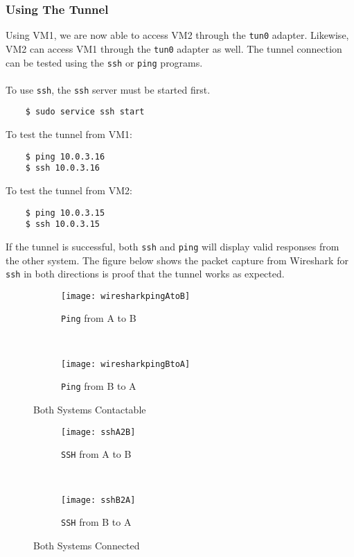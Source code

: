 \documentclass[a4paper,12pt]{article}
\begin{document}
	\subsubsection{Using The Tunnel}
	Using VM1, we are now able to access VM2 through the \texttt{tun0} adapter. Likewise, VM2 can access VM1 through the \texttt{tun0} adapter as well. The tunnel connection can be tested using the \texttt{ssh} or \texttt{ping} programs.\\\\
	To use \texttt{ssh}, the \texttt{ssh} server must be started first.
	\begin{verbatim}
	$ sudo service ssh start
	\end{verbatim}
	To test the tunnel from VM1:
	\begin{verbatim}
	$ ping 10.0.3.16
	$ ssh 10.0.3.16
	\end{verbatim}
	To test the tunnel from VM2:
	\begin{verbatim}
	$ ping 10.0.3.15
	$ ssh 10.0.3.15
	\end{verbatim}
	\noindent If the tunnel is successful, both \texttt{ssh} and \texttt{ping} will display valid responses from the other system. The figure below shows the packet capture from Wireshark for \texttt{ssh} in both directions is proof that the tunnel works as expected.
	\begin{figure}[H]
		\centering
		\begin{subfigure}[H]{1\textwidth}
			\centering
			\texttt{[image: wiresharkpingAtoB]}
			\caption{\texttt{Ping} from A to B}
			\label{fig:pingAB}
		\end{subfigure}
		\\
		\begin{subfigure}{1\textwidth}
			\centering
			\texttt{[image: wiresharkpingBtoA]}
			\caption{\texttt{Ping} from B to A}
			\label{fig:pingBA}
		\end{subfigure}
		\caption{Both Systems Contactable}
	\end{figure}
	\begin{figure}[H]
			\centering
			\begin{subfigure}[H]{0.47\textwidth}
				\centering
				\texttt{[image: sshA2B]}
				\caption{\texttt{SSH} from A to B}
				\label{fig:sshAB}
			\end{subfigure}
			~
			\begin{subfigure}{0.47\textwidth}
				\centering
				\texttt{[image: sshB2A]}
				\caption{\texttt{SSH} from B to A}
				\label{fig:sshBA}
			\end{subfigure}
			\caption{Both Systems Connected}
		\end{figure}
\end{document}
